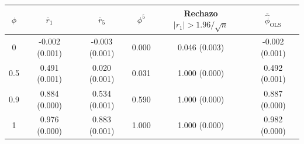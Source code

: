 \begin{tabular}{cccccc}
\toprule
$\phi$ & $\bar r_1$ & $\bar r_5$ & $\phi^5$ & Rechazo $|r_1|>1.96/\sqrt{n}$ & $\bar{\hat\phi}_{\text{OLS}}$ \\
\midrule
0 & -0.002 (0.001) & -0.003 (0.001) & 0.000 & 0.046 (0.003) & -0.002 (0.001) \\
0.5 & 0.491 (0.001) & 0.020 (0.001) & 0.031 & 1.000 (0.000) & 0.492 (0.001) \\
0.9 & 0.884 (0.000) & 0.534 (0.001) & 0.590 & 1.000 (0.000) & 0.887 (0.000) \\
1 & 0.976 (0.000) & 0.883 (0.001) & 1.000 & 1.000 (0.000) & 0.982 (0.000) \\
\bottomrule
\end{tabular}
